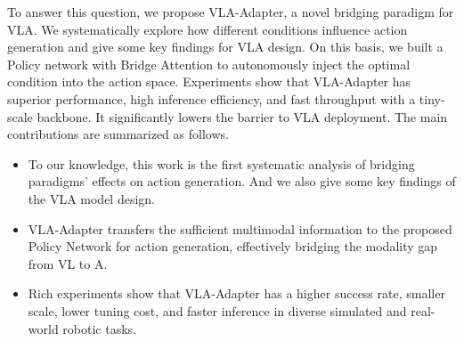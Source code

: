 To answer this question, we propose VLA-Adapter, a novel bridging paradigm for VLA. We systematically explore how different conditions influence action generation and give some key findings for VLA design. On this basis, we built a Policy network with Bridge Attention to autonomously inject the optimal condition into the action space. Experiments show that VLA-Adapter has superior performance, high inference efficiency, and fast throughput with a tiny-scale backbone. It significantly lowers the barrier to VLA deployment. The main contributions are summarized as follows.

\begin{itemize}
	\item To our knowledge, this work is the first systematic analysis of bridging paradigms' effects on action generation. And we also give some key findings of the VLA model design.
	\item VLA-Adapter transfers the sufficient multimodal information to the proposed Policy Network for action generation, effectively bridging the modality gap from VL to A. 
	\item Rich experiments show that VLA-Adapter has a higher success rate, smaller scale, lower tuning cost, and faster inference in diverse simulated and real-world robotic tasks.
\end{itemize}